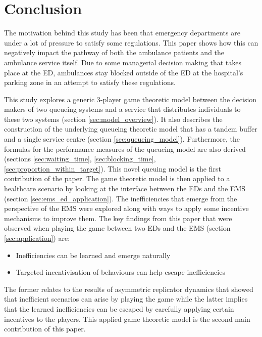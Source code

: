 \section{Conclusion}

The motivation behind this study has been that emergency departments are 
under a lot of pressure to satisfy some regulations. 
This paper shows how this can negatively impact the pathway of both the 
ambulance patients and the ambulance service itself.
Due to some managerial decision making that takes place at the ED, ambulances 
stay blocked outside of the ED at the hospital's parking zone in an attempt
to satisfy these regulations.

This study explores a generic 3-player game theoretic model between the 
decision makers of two queueing systems and a service that distributes 
individuals to these two systems (section \ref{sec:model_overview}).
It also describes the construction of the underlying queueing theoretic model 
that has a tandem buffer and a single service centre (section 
\ref{sec:queueing_model}).
Furthermore, the formulas for the performance measures of the queueing model 
are also derived (sections \ref{sec:waiting_time}, \ref{sec:blocking_time}, 
\ref{sec:proportion_within_target}). 
This novel queuing model is the first contribution of the paper.
The game theoretic model is then applied to a healthcare scenario by looking at
the interface between the EDs and the EMS (section 
\ref{sec:ems_ed_application}).
The inefficiencies that emerge from the perspective of the EMS were explored 
along with ways to apply some incentive mechanisms to improve them.
The key findings from this paper that were observed when playing the game
between two EDs and the EMS (section \ref{sec:application}) are:
\begin{itemize}
    \item Inefficiencies can be learned and emerge naturally
    \item Targeted incentivisation of behaviours can help escape inefficiencies
\end{itemize}
The former relates to the results of asymmetric replicator dynamics that showed 
that inefficient scenarios can arise by playing the game while the latter 
implies that the learned inefficiencies can be escaped by carefully applying 
certain incentives to the players.
This applied game theoretic model is the second main contribution of this paper.

